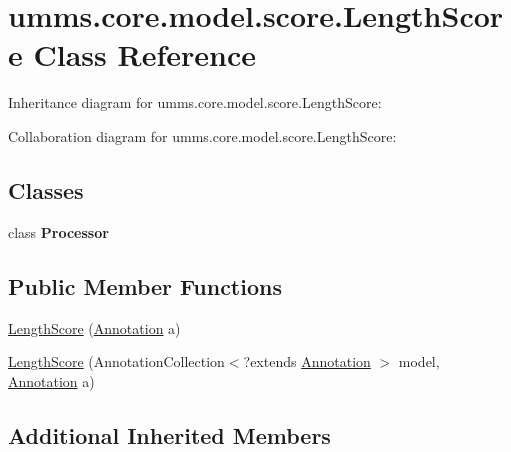 \hypertarget{classumms_1_1core_1_1model_1_1score_1_1_length_score}{\section{umms.\+core.\+model.\+score.\+Length\+Score Class Reference}
\label{classumms_1_1core_1_1model_1_1score_1_1_length_score}
}


Inheritance diagram for umms.\+core.\+model.\+score.\+Length\+Score\+:


Collaboration diagram for umms.\+core.\+model.\+score.\+Length\+Score\+:
\subsection*{Classes}
\begin{DoxyCompactItemize}
\item 
class {\bfseries Processor}
\end{DoxyCompactItemize}
\subsection*{Public Member Functions}
\begin{DoxyCompactItemize}
\item 
\hyperlink{classumms_1_1core_1_1model_1_1score_1_1_length_score_a325ad5fbb2b38df9b8aeb523c0ac2da2}{Length\+Score} (\hyperlink{interfaceumms_1_1core_1_1annotation_1_1_annotation}{Annotation} a)
\item 
\hyperlink{classumms_1_1core_1_1model_1_1score_1_1_length_score_ae4d48081bc00c512e4c868b05624fc37}{Length\+Score} (Annotation\+Collection$<$?extends \hyperlink{interfaceumms_1_1core_1_1annotation_1_1_annotation}{Annotation} $>$ model, \hyperlink{interfaceumms_1_1core_1_1annotation_1_1_annotation}{Annotation} a)
\end{DoxyCompactItemize}
\subsection*{Additional Inherited Members}


